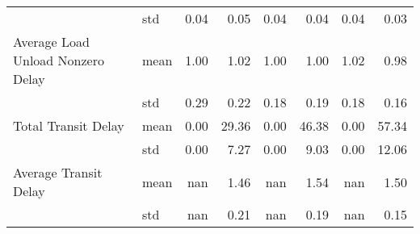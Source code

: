 \begin{longtable}{llrrrrrr}
                   & std &                           0.04 &                             0.05 &                           0.04 &                             0.04 &                           0.04 &                             0.03 \\
Average Load Unload Nonzero Delay & mean &                           1.00 &                             1.02 &                           1.00 &                             1.00 &                           1.02 &                             0.98 \\
                   & std &                           0.29 &                             0.22 &                           0.18 &                             0.19 &                           0.18 &                             0.16 \\
Total Transit Delay & mean &                           0.00 &                            29.36 &                           0.00 &                            46.38 &                           0.00 &                            57.34 \\
                   & std &                           0.00 &                             7.27 &                           0.00 &                             9.03 &                           0.00 &                            12.06 \\
Average Transit Delay & mean &                            nan &                             1.46 &                            nan &                             1.54 &                            nan &                             1.50 \\
                   & std &                            nan &                             0.21 &                            nan &                             0.19 &                            nan &                             0.15 \\
\end{longtable}
